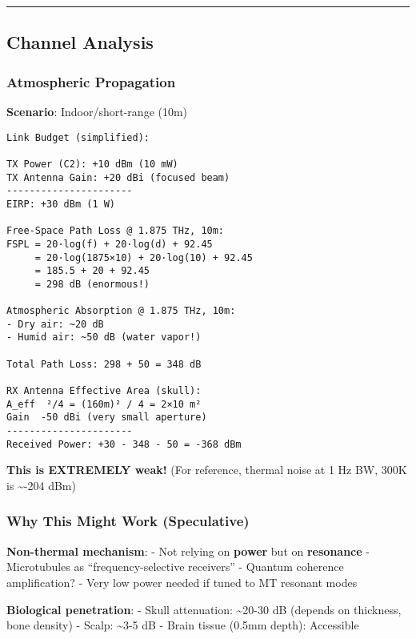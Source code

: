 \begin{center}\rule{0.5\linewidth}{0.5pt}\end{center}

\subsection{Channel Analysis}\label{channel-analysis}

\subsubsection{Atmospheric Propagation}\label{atmospheric-propagation}

\textbf{Scenario}: Indoor/short-range (10m)

\begin{verbatim}
Link Budget (simplified):

TX Power (C2): +10 dBm (10 mW)
TX Antenna Gain: +20 dBi (focused beam)
----------------------
EIRP: +30 dBm (1 W)

Free-Space Path Loss @ 1.875 THz, 10m:
FSPL = 20·log(f) + 20·log(d) + 92.45
     = 20·log(1875×10) + 20·log(10) + 92.45
     = 185.5 + 20 + 92.45
     = 298 dB (enormous!)

Atmospheric Absorption @ 1.875 THz, 10m:
- Dry air: ~20 dB
- Humid air: ~50 dB (water vapor!)

Total Path Loss: 298 + 50 = 348 dB

RX Antenna Effective Area (skull):
A_eff  ²/4 = (160m)² / 4 = 2×10 m²
Gain  -50 dBi (very small aperture)
----------------------
Received Power: +30 - 348 - 50 = -368 dBm
\end{verbatim}

\textbf{This is EXTREMELY weak!} (For reference, thermal noise at 1 Hz
BW, 300K is \textasciitilde-204 dBm)

\subsubsection{Why This Might Work
(Speculative)}\label{why-this-might-work-speculative}

\textbf{Non-thermal mechanism}: - Not relying on \textbf{power} but on
\textbf{resonance} - Microtubules as ``frequency-selective receivers'' -
Quantum coherence amplification? - Very low power needed if tuned to MT
resonant modes

\textbf{Biological penetration}: - Skull attenuation:
\textasciitilde20-30 dB (depends on thickness, bone density) - Scalp:
\textasciitilde3-5 dB - Brain tissue (0.5mm depth): Accessible

